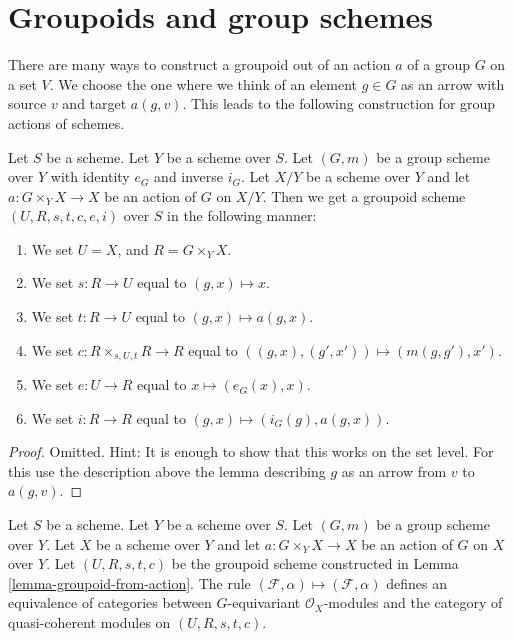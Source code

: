 \section{Groupoids and group schemes}
\label{section-groupoids-group-schemes}

\noindent
There are many ways to construct a groupoid out of an action $a$
of a group $G$ on a set $V$. We choose the one where we think
of an element $g \in G$ as an arrow with source $v$ and target $a(g, v)$.
This leads to the following construction for group actions of
schemes.

\begin{lemma}
\label{lemma-groupoid-from-action}
Let $S$ be a scheme.
Let $Y$ be a scheme over $S$.
Let $(G, m)$ be a group scheme over $Y$ with
identity $e_G$ and inverse $i_G$.
Let $X/Y$ be a scheme over $Y$ and let $a : G \times_Y X \to X$
be an action of $G$ on $X/Y$.
Then we get a groupoid scheme $(U, R, s, t, c, e, i)$ over $S$
in the following manner:
\begin{enumerate}
\item We set $U = X$, and $R = G \times_Y X$.
\item We set $s : R \to U$ equal to $(g, x) \mapsto x$.
\item We set $t : R \to U$ equal to $(g, x) \mapsto a(g, x)$.
\item We set $c : R \times_{s, U, t} R \to R$ equal to
$((g, x), (g', x')) \mapsto (m(g, g'), x')$.
\item We set $e : U \to R$ equal to $x \mapsto (e_G(x), x)$.
\item We set $i : R \to R$ equal to $(g, x) \mapsto (i_G(g), a(g, x))$.
\end{enumerate}
\end{lemma}

\begin{proof}
Omitted. Hint: It is enough to show that this works on the set
level. For this use the description above the lemma describing
$g$ as an arrow from $v$ to $a(g, v)$.
\end{proof}

\begin{lemma}
\label{lemma-action-groupoid-modules}
Let $S$ be a scheme.
Let $Y$ be a scheme over $S$.
Let $(G, m)$ be a group scheme over $Y$.
Let $X$ be a scheme over $Y$ and let $a : G \times_Y X \to X$
be an action of $G$ on $X$ over $Y$. Let $(U, R, s, t, c)$ be
the groupoid scheme constructed in Lemma \ref{lemma-groupoid-from-action}.
The rule
$(\mathcal{F}, \alpha) \mapsto (\mathcal{F}, \alpha)$ defines
an equivalence of categories between $G$-equivariant
$\mathcal{O}_X$-modules and the category of quasi-coherent
modules on $(U, R, s, t, c)$.
\end{lemma}

